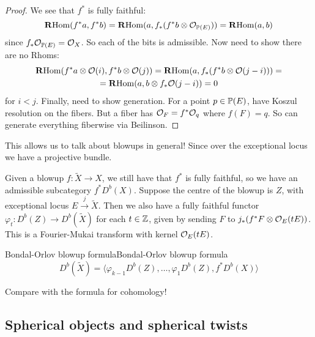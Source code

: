 \begin{proof}
    We see that $f^*$ is fully faithful:
    \begin{equation*}
        \RHom(f^*a,f^*b) = \RHom(a,f_*(f^*b\otimes\O_{\P(E)})) = \RHom(a,b)
    \end{equation*}
    since $f_*\O_{\P(E)}=\O_X$. So each of the bits is admissible. Now need to show there are no Rhoms:
    \begin{gather*}
        \RHom(f^*a\otimes\O(i),f^*b\otimes\O(j))
            = \RHom(a,f_*(f^*b\otimes \O(j-i))) = \\
            = \RHom(a,b\otimes f_*\O(j-i)) = 0
    \end{gather*}
for $i<j$. Finally, need to show generation. For a point $p\in\P(E)$, have Koszul resolution on the fibers. But a fiber has $\O_F=f^*\O_q$ where $f(F)=q$. So can generate everything fiberwise via Beilinson.
\end{proof}

This allows us to talk about blowups in general! Since over the exceptional locus we have a projective bundle.

Given a blowup $f:\tilde{X}\to X$, we still have that $f^*$ is fully faithful, so we have an admissible subcategory $f^*D^b(X)$. Suppose the centre of the blowup is $Z$, with exceptional locus $E\xrightarrow{j}\tilde X$. Then we also have a fully faithful functor $\varphi_t:D^b(Z)\to D^b(\tilde{X})$ for each $t\in\Z$, given by sending $F$ to $j_*(f^*F\otimes\O_E(tE))$. This is a Fourier-Mukai transform with kernel $\O_E(tE)$.


\begin{theorem}{Bondal-Orlov blowup formula}{Bondal-Orlov blowup formula}
    \begin{equation*}
        D^b(\tilde{X}) = \langle\varphi_{k-1}D^b(Z),\ldots,\varphi_1D^b(Z),f^*D^b(X)\rangle
    \end{equation*}
\end{theorem}

Compare with the formula for cohomology!

\subsection{Spherical objects and spherical twists}

